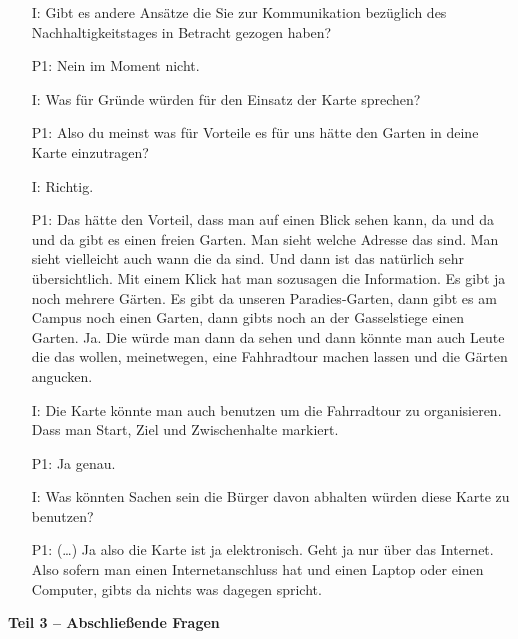\documentclass{sigchi}
\begin{document}
\begin{itemize}
	\item[I:] Gibt es andere Ans{\"a}tze die Sie zur Kommunikation bez{\"u}glich des Nachhaltigkeitstages in Betracht gezogen haben?
	\item[P1:] Nein im Moment nicht.
	\item[I:] Was f{\"u}r Gr{\"u}nde w{\"u}rden f{\"u}r den Einsatz der Karte sprechen? 
    \item[P1:] Also du meinst was f{\"u}r Vorteile es f{\"u}r uns h{\"a}tte den Garten in deine Karte einzutragen?
    \item[I:] Richtig.
	\item[P1:] Das h{\"a}tte den Vorteil, dass man auf einen Blick sehen kann, da und da und da gibt es einen freien Garten. Man sieht welche Adresse das sind. Man sieht vielleicht auch wann die da sind. Und dann ist das nat{\"u}rlich sehr {\"u}bersichtlich. Mit einem Klick hat man sozusagen die Information. Es gibt ja noch mehrere G{\"a}rten. Es gibt da unseren Paradies-Garten, dann gibt es am Campus noch einen Garten, dann gibts noch an der Gasselstiege einen Garten. Ja. Die w{\"u}rde man dann da sehen und dann k{\"o}nnte man auch Leute die das wollen, meinetwegen, eine Fahhradtour machen lassen und die G{\"a}rten angucken.
	\item[I:] Die Karte k{\"o}nnte man auch benutzen um die Fahrradtour zu organisieren. Dass man Start, Ziel und Zwischenhalte markiert. 
	\item[P1:] Ja genau.
	\item[I:] Was k{\"o}nnten Sachen sein die B{\"u}rger davon abhalten w{\"u}rden diese Karte zu benutzen?
	\item[P1:] (\dots) Ja also die Karte ist ja elektronisch. Geht ja nur {\"u}ber das Internet. Also sofern man einen Internetanschluss hat und einen Laptop oder einen Computer, gibts da nichts was dagegen spricht.
\end{itemize}
\textbf{Teil 3 -- Abschlie{\ss}ende Fragen}
\end{document}
